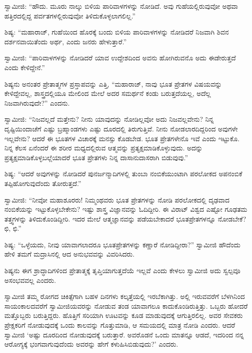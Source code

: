  ಸ್ವಾಮೀಜಿ: “ಹೌದು. ಮೂರು ನಾಲ್ಕು ಬಿಳಿಯ ಪಾರಿವಾಳಗಳನ್ನು ನೋಡಿದೆ. ಅವು ಗುಹೆಯಲ್ಲಿರುವುವೋ ಅಥವಾ ಹತ್ತಿರದಲ್ಲಿದ್ದ ಪರ್ವತಗಳಲ್ಲಿರುವುವೋ‌ ತಿಳಿದುಕೊಳ್ಳಲಾಗಲಿಲ್ಲ.” 

 ಶಿಷ್ಯ: “ಮಹಾರಾಜ್, ಗುಹೆಯಿಂದ ಹೊರಕ್ಕೆ ಬಂದು ಬಿಳಿಯ ಪಾರಿವಾಳಗಳನ್ನು ನೋಡಿದರೆ ನಿಜವಾಗಿ ಶಿವನ ದರ್ಶನವಾಯಿತೆಂದು ಅರ್ಥ, ಎಂದು ಜನರು ಹೇಳುತ್ತಾರೆ.” 

 ಸ್ವಾಮೀಜಿ: “ಪಾರಿವಾಳಗಳನ್ನು ನೋಡಿದರೆ ಯಾವ ಉದ್ದೇಶದಿಂದ ಅವನು ಹೋಗಿರುವನೊ ಅದು ಈಡೇರುತ್ತದೆ ಎಂದು ಕೇಳಿದ್ದೇನೆ.” 

 ಶಿಷ್ಯನು ಅನಂತರ ಪ್ರೇತಾತ್ಮಗಳ ಪ್ರಸ್ತಾಪವನ್ನು ಎತ್ತಿ, “ಮಹಾರಾಜ್, ನಾವು ಭೂತ ಪ್ರೇತಗಳ ವಿಷಯವನ್ನು ಕೇಳಿದ್ದೇವಲ್ಲ, ಶಾಸ್ತ್ರದಲ್ಲಿಯೂ ಮೇಲಿಂದ ಮೇಲೆ ಅದರ ಸಮರ್ಥನೆ ಕಂಡು ಬರುತ್ತದೆಯಲ್ಲ, ಅದೆಲ್ಲ ನಿಜವಾಗಿರುವುದೇ?” ಎಂದನು. 

 ಸ್ವಾಮೀಜಿ: “ನಿಜವಲ್ಲದೆ ಮತ್ತೇನು? ನೀನು ಯಾವುದನ್ನು ನೋಡಿಲ್ಲವೋ ಅದು ನಿಜವಲ್ಲವೇನು? ನಿನ್ನ ದೃಷ್ಟಿಯಿಂದಾಚೆಗೆ ಎಷ್ಟು ಬ್ರಹ್ಮಾಂಡಗಳು ಎಷ್ಟು ದೂರದಲ್ಲಿ ತಿರುಗುತ್ತಿವೆ. ನೀನು ನೋಡಲಾರದಿದ್ದರಿಂದ ಅವುಗಳೇ ಇಲ್ಲವೇನು? ಆದರೆ ಈ ಭೂತಗಳ ವಿಚಾರಕ್ಕೆ ಮನಸ್ಸು ಕೊಡಬೇಡ. ಭೂತ ಪ್ರೇತಗಳೇನೊ ಇವೆ ಎಂದು ಇಟ್ಟುಕೊ. ನಿನ್ನ ಕೆಲಸ ಏನೆಂದರೆ ಈ ಶರೀರ ಮಧ್ಯದಲ್ಲಿರುವ ಆತ್ಮವನ್ನು ಪ್ರತ್ಯಕ್ಷಮಾಡಿಕೊಳ್ಳುವುದು. ಅದನ್ನು ಪ್ರತ್ಯಕ್ಷಮಾಡಿಕೊಳ್ಳಬಲ್ಲೆಯಾದರೆ ಭೂತ ಪ್ರೇತಗಳು ನಿನ್ನ ದಾಸಾನುದಾಸರಾಗಿ ಬಿಡುವುವು.” 

 ಶಿಷ್ಯ: “ಆದರೆ ಅವುಗಳನ್ನು ನೋಡಿದರೆ ಪುನರ್ಜನ್ಮಾದಿಗಳಲ್ಲಿ ತುಂಬಾ ನಂಬಿಕೆಯುಂಟಾಗಿ ಪರಲೋಕದ ಅಪನಂಬಿಕೆ ತಪ್ಪಿಹೋಗುವುದೆಂದು ತೋರುತ್ತದೆ.” 

 ಸ್ವಾಮೀಜಿ: “ನೀವೋ ಮಹಾಶೂರರು! ನಿಮ್ಮಂಥವರು ಭೂತ ಪ್ರೇತಗಳನ್ನು ನೋಡಿ ಪರಲೋಕದಲ್ಲಿ ದೃಢವಾದ ನಂಬಿಕೆಯನ್ನು ಇಟ್ಟುಕೊಳ್ಳಬೇಕೇನು? ಇಷ್ಟು ಶಾಸ್ತ್ರ ವಿಜ್ಞಾನವನ್ನು ಓದಿದ್ದೀರಿ. ಈ ವಿರಾಟ್ ವಿಶ್ವದ ಎಷ್ಟೋ ಗೂಢತಮ ತತ್ತ್ವಗಳನ್ನು ತಿಳಿದುಕೊಂಡಿದ್ದೀರಿ. ಇದರ ಮೇಲೆ ಆತ್ಮಜ್ಞಾನವನ್ನು ಪಡೆಯಬೇಕಾದರೆ ಭೂತಪ್ರೇತಗಳನ್ನೂ ನೋಡಬೇಕೆ? ಛಿ, ಛಿ.” 

 ಶಿಷ್ಯ: “ಒಳ್ಳೆಯದು, ನೀವು ಯಾವಾಗಲಾದರೂ ಭೂತಪ್ರೇತಗಳನ್ನು ಕಣ್ಣಾರೆ ನೋಡಿದ್ದೀರಾ?” ಸ್ವಾಮೀಜಿ ಹೌದೆಂದು ಹೇಳಿ ತಮಗೆ ಮದ್ರಾಸಿನಲ್ಲಿ ಆದ ಅನುಭವವನ್ನು ವಿವರಿಸಿದರು. 

 ಶಿಷ್ಯನು ಈಗ ಶ್ರಾದ್ಧಾದಿಗಳಿಂದ ಪ್ರೇತಾತ್ಮಕ್ಕೆ ತೃಪ್ತಿಯಾಗುತ್ತದೆಯೆ ಇಲ್ಲವೆ ಎಂದು ಕೇಳಲು ಸ್ವಾಮೀಜಿ ಅದು ಸ್ವಲ್ಪವೂ ಅಸಂಭವವಲ್ಲ ಎಂದರು. 

 ಸ್ವಾಮೀಜಿ ತಮ್ಮ ರೋಗದ ಚಿಕಿತ್ಸೆಗಾಗಿ ಬಹಳ ದಿನಗಳು ಕಲ್ಕತ್ತೆಯಲ್ಲಿ ಇರಬೆಕಾಗಿತ್ತು. ಅಲ್ಲಿ ಇರುವವರೆಗೆ ಬೆಳಗಿನಿಂದ ಸಾಯಂಕಾಲದವರೆಗೆ ಸ್ವಾಮೀಜಿಯವರನ್ನು ನೋಡುವ ತಂಡ ಯಾವಾಗಲೂ ಕಾದುಕೊಂಡಿರುತ್ತಿತ್ತು. ಒಬ್ಬರು ಹೋದರೆ ಮತ್ತೊಬ್ಬರು ಬರುತ್ತಿದ್ದರು. ಹೊತ್ತಿಗೆ ಸರಿಯಾಗಿ ಊಟವನ್ನು ಕೂಡ ಮಾಡುವುದಕ್ಕೆ ಆಗುತ್ತಿರಲಿಲ್ಲ. ಅವರ ಸೇವಕರು ಪ್ರೇಕ್ಷಕರಿಗೆ ನೋಡುವುದಕ್ಕೆ ಒಂದು ಕಾಲವನ್ನು ಗೊತ್ತುಮಾಡಿ, ಆ ಸಮಯದಲ್ಲಿ ಮಾತ್ರ ನೋಡಿ ಎಂದರು. ಆದರೆ ಸ್ವಾಮೀಜಿ ‘ಅಷ್ಟು ದೂರದಿಂದ ನೋಡುವುದಕ್ಕೆ ಬರುತ್ತಾರೆ. ಅವರೊಡನೆ ಒಂದು ಮಾತನ್ನೂ ಆಡದೆ, ಇದರಿಂದ ನನ್ನ ಆರೋಗ್ಯಕ್ಕೆ ಭಂಗವಾಗುವುದೆಂದು ಅವರನ್ನು ಹೇಗೆ ಕಳುಹಿಸಿಬಿಡುವುದು?’ ಎಂದರು. 

